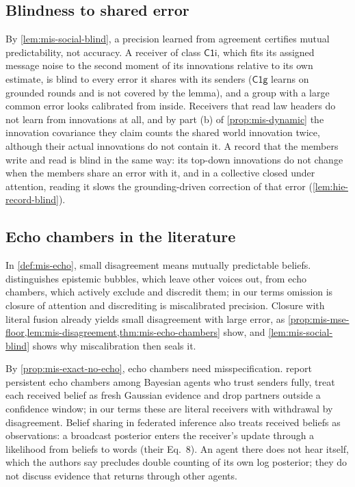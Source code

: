 \subsection{Blindness to shared error}\label{sup:mis-blindness-to-shared-error}

By \cref{lem:mis-social-blind}, a precision learned from agreement certifies mutual predictability, not accuracy. A receiver of class $\mathsf{C1i}$, which fits its assigned message noise to the second moment of its innovations relative to its own estimate, is blind to every error it shares with its senders ($\mathsf{C1g}$ learns on grounded rounds and is not covered by the lemma), and a group with a large common error looks calibrated from inside. Receivers that read law headers do not learn from innovations at all, and by part (b) of \cref{prop:mis-dynamic} the innovation covariance they claim counts the shared world innovation twice, although their actual innovations do not contain it. A record that the members write and read is blind in the same way: its top-down innovations do not change when the members share an error with it, and in a collective closed under attention, reading it slows the grounding-driven correction of that error (\cref{lem:hie-record-blind}).

\subsection{Echo chambers in the literature}\label{sup:mis-echo-chambers-in-the-literature}

In \cref{def:mis-echo}, small disagreement means mutually predictable beliefs. \citet{nguyen2020echo} distinguishes epistemic bubbles, which leave other voices out, from echo chambers, which actively exclude and discredit them; in our terms omission is closure of attention and discrediting is miscalibrated precision. Closure with literal fusion already yields small disagreement with large error, as \cref{prop:mis-mse-floor,lem:mis-disagreement,thm:mis-echo-chambers} show, and \cref{lem:mis-social-blind} shows why miscalibration then seals it.

By \cref{prop:mis-exact-no-echo}, echo chambers need misspecification. \citet{madsen2018large} report persistent echo chambers among Bayesian agents who trust senders fully, treat each received belief as fresh Gaussian evidence and drop partners outside a confidence window; in our terms these are literal receivers with withdrawal by disagreement. Belief sharing in federated inference \citep{friston2024federated} also treats received beliefs as observations: a broadcast posterior enters the receiver's update through a likelihood from beliefs to words (their Eq.~8). An agent there does not hear itself, which the authors say precludes double counting of its own log posterior; they do not discuss evidence that returns through other agents.
